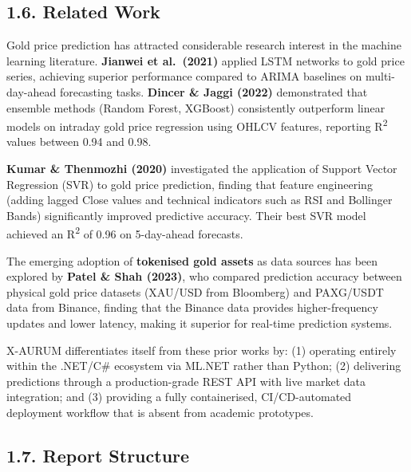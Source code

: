 \subsection{1.6. Related Work}

Gold price prediction has attracted considerable research interest in the machine learning literature. \textbf{Jianwei et al.\ (2021)} applied LSTM networks to gold price series, achieving superior performance compared to ARIMA baselines on multi-day-ahead forecasting tasks. \textbf{Dincer \& Jaggi (2022)} demonstrated that ensemble methods (Random Forest, XGBoost) consistently outperform linear models on intraday gold price regression using OHLCV features, reporting R\textsuperscript{2} values between 0.94 and 0.98.

\textbf{Kumar \& Thenmozhi (2020)} investigated the application of Support Vector Regression (SVR) to gold price prediction, finding that feature engineering (adding lagged Close values and technical indicators such as RSI and Bollinger Bands) significantly improved predictive accuracy. Their best SVR model achieved an R\textsuperscript{2} of 0.96 on 5-day-ahead forecasts.

The emerging adoption of \textbf{tokenised gold assets} as data sources has been explored by \textbf{Patel \& Shah (2023)}, who compared prediction accuracy between physical gold price datasets (XAU/USD from Bloomberg) and PAXG/USDT data from Binance, finding that the Binance data provides higher-frequency updates and lower latency, making it superior for real-time prediction systems.

X-AURUM differentiates itself from these prior works by: (1) operating entirely within the .NET/C\# ecosystem via ML.NET rather than Python; (2) delivering predictions through a production-grade REST API with live market data integration; and (3) providing a fully containerised, CI/CD-automated deployment workflow that is absent from academic prototypes.

\subsection{1.7. Report Structure}

